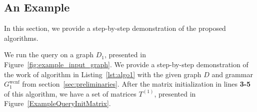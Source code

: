 




\subsection{An Example}
In this section, we provide a step-by-step demonstration of the proposed algorithms. %

We run the query on a graph $D_1$, presented in Figure~\ref{fig:example_input_graph}. We provide a step-by-step demonstration of the work of algorithm in Listing~\ref{lst:algo1} with the given graph $D$ and grammar $G_1^{\text{wcnf}}$ from section~\ref{sec:preliminaries}. After the matrix initialization in lines \textbf{3-5} of this algorithm, we have a set of matrices $T^{(1)}$, presented in Figure~\ref{ExampleQueryInitMatrix}.

